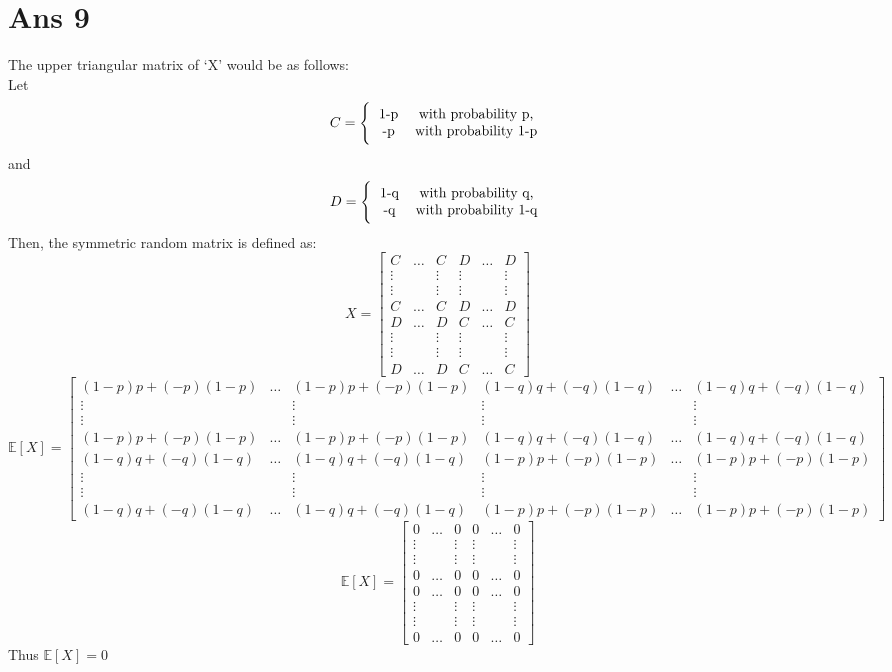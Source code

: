 \documentclass[10pt]{article}
\begin{document}
\section*{Ans 9}
\begin{flushleft}
The upper triangular matrix of `X' would be as follows:\\
\vspace{0.5em}
Let
$$
C =
\Bigg \{
  \begin{tabular}{cc}
  1-p & with probability p, \\
  -p & with probability 1-p
  \end{tabular}
$$
and $$
D =
\Bigg \{
  \begin{tabular}{cc}
  1-q & with probability q, \\
  -q & with probability 1-q
  \end{tabular}
$$
Then, the symmetric random matrix is defined as:\\
$$ X = 
\begin{bmatrix} 
C & \hdots & C & D & \hdots & D\\
\vdots & & \vdots & \vdots & & \vdots\\
\vdots & & \vdots & \vdots & & \vdots\\
C & \hdots & C & D & \hdots & D\\
D & \hdots & D & C & \hdots & C\\ 
\vdots & & \vdots & \vdots & & \vdots\\
\vdots & & \vdots & \vdots & & \vdots\\
D & \hdots & D & C & \hdots & C
\end{bmatrix}
$$
$$ \mathbb{E}[X] =
\begin{bmatrix} 
(1-p)p+(-p)(1-p) & \hdots & (1-p)p+(-p)(1-p) & (1-q)q+(-q)(1-q) & \hdots & (1-q)q+(-q)(1-q)\\
\vdots & & \vdots & \vdots & & \vdots\\
\vdots & & \vdots & \vdots & & \vdots\\
(1-p)p+(-p)(1-p) & \hdots & (1-p)p+(-p)(1-p) & (1-q)q+(-q)(1-q) & \hdots & (1-q)q+(-q)(1-q)\\
(1-q)q+(-q)(1-q) & \hdots & (1-q)q+(-q)(1-q) & (1-p)p+(-p)(1-p) & \hdots & (1-p)p+(-p)(1-p)\\ 
\vdots & & \vdots & \vdots & & \vdots\\
\vdots & & \vdots & \vdots & & \vdots\\
(1-q)q+(-q)(1-q) & \hdots & (1-q)q+(-q)(1-q) & (1-p)p+(-p)(1-p) & \hdots & (1-p)p+(-p)(1-p)
\end{bmatrix}
$$
$$ \mathbb{E}[X] = 
\begin{bmatrix} 
0 & \hdots & 0 & 0 & \hdots & 0\\
\vdots & & \vdots & \vdots & & \vdots\\
\vdots & & \vdots & \vdots & & \vdots\\
0 & \hdots & 0 & 0 & \hdots & 0\\
0 & \hdots & 0 & 0 & \hdots & 0\\ 
\vdots & & \vdots & \vdots & & \vdots\\
\vdots & & \vdots & \vdots & & \vdots\\
0 & \hdots & 0 & 0 & \hdots & 0
\end{bmatrix}
$$ 
Thus $\mathbb{E}[X] = 0$
\end{flushleft}
\end{document}
